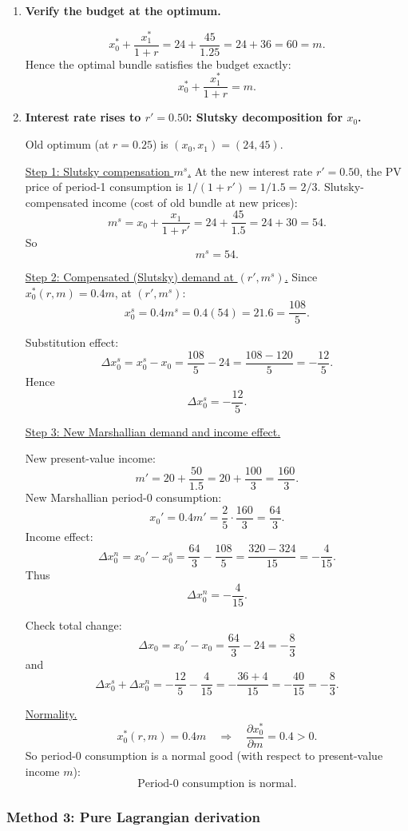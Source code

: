 \documentclass[12pt]{article}
\begin{document}
\begin{enumerate}[label=(\alph*)]
\item \textbf{Verify the budget at the optimum.}

\[
x_0^*+\frac{x_1^*}{1+r}
=24+\frac{45}{1.25}
=24+36
=60
=m.
\]
Hence the optimal bundle satisfies the budget exactly:
\[
\boxed{x_0^*+\frac{x_1^*}{1+r}=m.}
\]

\item \textbf{Interest rate rises to \(r'=0.50\): Slutsky decomposition for \(x_0\).}

Old optimum (at \(r=0.25\)) is \((x_0,x_1)=(24,45)\).

\medskip
\noindent\underline{Step 1: Slutsky compensation \(m^s\).}  
At the new interest rate \(r'=0.50\), the PV price of period-1 consumption is \(1/(1+r')=1/1.5=2/3\).  
Slutsky-compensated income (cost of old bundle at new prices):
\[
m^s=x_0+\frac{x_1}{1+r'}
=24+\frac{45}{1.5}
=24+30
=54.
\]
So
\[
\boxed{m^s=54.}
\]

\medskip
\noindent\underline{Step 2: Compensated (Slutsky) demand at \((r',m^s)\).}
Since \(x_0^*(r,m)=0.4m\), at \((r',m^s)\):
\[
x_0^s=0.4m^s=0.4(54)=21.6=\frac{108}{5}.
\]

Substitution effect:
\[
\Delta x_0^s=x_0^s-x_0
=\frac{108}{5}-24
=\frac{108-120}{5}
=-\frac{12}{5}.
\]
Hence
\[
\boxed{\Delta x_0^s=-\frac{12}{5}.}
\]

\medskip
\noindent\underline{Step 3: New Marshallian demand and income effect.}

New present-value income:
\[
m'=20+\frac{50}{1.5}=20+\frac{100}{3}=\frac{160}{3}.
\]
New Marshallian period-0 consumption:
\[
x_0' = 0.4m'=\frac{2}{5}\cdot\frac{160}{3}=\frac{64}{3}.
\]
Income effect:
\[
\Delta x_0^n=x_0'-x_0^s
=\frac{64}{3}-\frac{108}{5}
=\frac{320-324}{15}
=-\frac{4}{15}.
\]
Thus
\[
\boxed{\Delta x_0^n=-\frac{4}{15}.}
\]

Check total change:
\[
\Delta x_0 = x_0'-x_0 = \frac{64}{3}-24=-\frac{8}{3}
\]
and
\[
\Delta x_0^s+\Delta x_0^n=-\frac{12}{5}-\frac{4}{15}
=-\frac{36+4}{15}
=-\frac{40}{15}
=-\frac{8}{3}.
\]

\medskip
\noindent\underline{Normality.}
\[
x_0^*(r,m)=0.4m
\quad\Rightarrow\quad
\frac{\partial x_0^*}{\partial m}=0.4>0.
\]
So period-0 consumption is a normal good (with respect to present-value income \(m\)):
\[
\boxed{\text{Period-0 consumption is normal.}}
\]
\end{enumerate}

\newpage
\subsubsection*{Method 3: Pure Lagrangian derivation}
\end{document}
